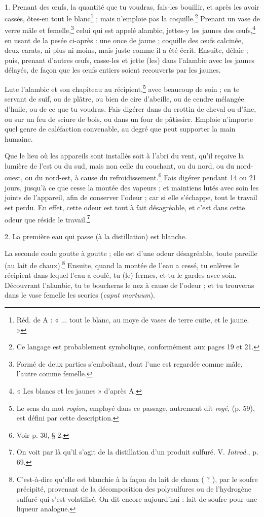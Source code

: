 \documentclass[a4paper, 11pt, oneside, polutonikogreek, french]{article}
\begin{document}
\paragraph{}
1. Prenant des œufs, la quantité que tu voudras, fais-les bouillir, et après les avoir cassés, ôtes-en tout le blanc\footnote{Réd. de A : « ... tout le blanc, au moye de vases de terre cuite, et le jaune. »} ; mais n'emploie pas la coquille.\footnote{Ce langage est probablement symbolique, conformément aux pages 19 et 21.} Prenant un vase de verre mâle et femelle,\footnote{Formé de deux parties s'emboîtant, dont l'une est regardée comme mâle, l'autre comme femelle.} celui qui est appelé alambic, jettes-y les jaunes des œufs,\footnote{« Les blancs et les jaunes » d'après A.} en usant de la pesée ci-après : une once de jaune ; coquille des œufs calcinée, deux carats, ni plus ni moins, mais juste comme il a été écrit. Ensuite, délaie ; puis, prenant d'autres œufs, casse-les et jette (les) dans l'alambic avec les jaunes délayés, de façon que les œufs entiers soient recouverts par les jaunes.

Lute l'alambic et son chapiteau au récipient,\footnote{Le sens du mot \emph{rogion}, employé dans ce passage, autrement dit \emph{rogé}, (p. 59), est défini par cette description.} avec beaucoup de soin ; en te servant de suif, ou de plâtre, ou bien de cire d'abeille, ou de cendre mélangée d'huile, ou de ce que tu voudras. Fais digérer dans du crottin de cheval ou d'âne, ou sur un feu de sciure de bois, ou dans un four de pâtissier. Emploie n'importe quel genre de caléfaction convenable, au degré que peut supporter la main humaine.

Que le lieu où les appareils sont installés soit à l'abri du vent, qu'il reçoive la lumière de l'est ou du sud, mais non celle du couchant, ou du nord, ou du nord-ouest, ou du nord-est, à cause du refroidissement.\footnote{Voir p. 30, § 2.} Fais digérer pendant 14 ou 21 jours, jusqu'à ce que cesse la montée des vapeurs ; et maintiens lutés avec soin les joints de l'appareil, afin de conserver l'odeur ; car si elle s'échappe, tout le travail est perdu. En effet, cette odeur est tout à fait désagréable, et c'est dans cette odeur que réside le travail.\footnote{On voit par là qu'il s'agit de la distillation d'un produit sulfuré. V. \emph{Introd.}, p. 69.}

2. La première eau qui passe (à la distillation) est blanche.

La seconde coule goutte à goutte ; elle est d'une odeur désagréable, toute pareille (au lait de chaux).\footnote{C'est-à-dire qu'elle est blanchie à la façon du lait de chaux ( ? ), par le soufre précipité, provenant de la décomposition des polysulfures ou de l'hydrogène sulfuré qui s'est volatilisé. On dit encore aujourd'hui : lait de soufre pour une liqueur analogue.} Ensuite, quand la montée de l'eau a cessé, tu enlèves le récipient dans lequel l'eau a coulé, tu (le) fermes, et tu le gardes avec soin. Découvrant l'alambic, tu te boucheras le nez à cause de l'odeur ; et tu trouveras dans le vase femelle les scories (\emph{caput mortuum}).
\end{document}
